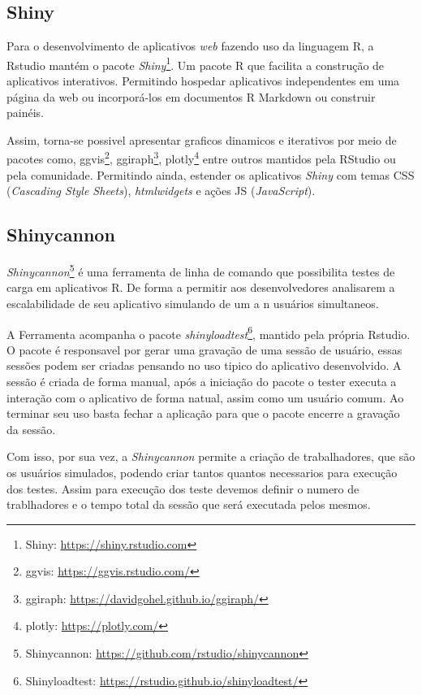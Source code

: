 \documentclass[12pt,english,brazil]{article}
\begin{document}
\subsection{Shiny} \label{sec:Shiny}

Para o desenvolvimento de aplicativos \emph{web} fazendo uso da linguagem R, a Rstudio mantém o pacote \emph{Shiny}\footnote{Shiny: \url{https://shiny.rstudio.com}}. Um pacote R que facilita a construção de aplicativos interativos. Permitindo hospedar aplicativos independentes em uma página da web ou incorporá-los em documentos R Markdown ou construir painéis. 

Assim, torna-se possivel apresentar graficos dinamicos e iterativos por meio de pacotes como, ggvis\footnote{ggvis: \url{https://ggvis.rstudio.com/}}, ggiraph\footnote{ggiraph: \url{https://davidgohel.github.io/ggiraph/}}, plotly\footnote{plotly: \url{https://plotly.com/}} entre outros mantidos pela RStudio ou pela comunidade. Permitindo ainda, estender os aplicativos \emph{Shiny} com temas CSS (\emph{Cascading Style Sheets}), \emph{htmlwidgets} e ações JS (\emph{JavaScript}).

\subsection{Shinycannon} \label{sec:Shinycannon}

\textit{Shinycannon}\footnote{Shinycannon: \url{https://github.com/rstudio/shinycannon}} é uma ferramenta de linha de comando que possibilita testes de carga em aplicativos R. De forma a permitir aos desenvolvedores analisarem a escalabilidade de seu aplicativo simulando de um a n usuários simultaneos.

A Ferramenta acompanha o pacote \textit{shinyloadtest}\footnote{Shinyloadtest: \url{https://rstudio.github.io/shinyloadtest/}}, mantido pela própria Rstudio. O pacote é responsavel por gerar uma gravação de uma sessão de usuário, essas sessões podem ser criadas pensando no uso tipico do aplicativo desenvolvido\cite{shinyloadtest}. A sessão é criada de forma manual, após a iniciação do pacote o tester executa a interação com o aplicativo de forma natual, assim como um usuário comum. Ao terminar seu uso basta fechar a aplicação para que o pacote encerre a gravação da sessão.

Com isso, por sua vez, a \textit{Shinycannon} permite a criação de trabalhadores, que são os usuários simulados, podendo criar tantos quantos necessarios para execução dos testes. Assim para execução dos teste devemos definir o numero de trablhadores e o tempo total da sessão que será executada pelos mesmos. 
\end{document}
